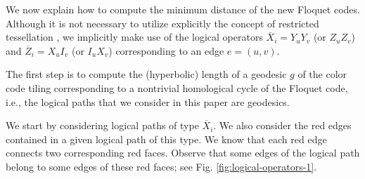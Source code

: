 \documentclass[%
reprint,
amsmath,amssymb,
aps,
]{revtex4-2}
\begin{document}
We now explain how to compute the minimum distance of the new Floquet codes. 
Although it is not necessary to utilize explicitly the concept of 
restricted tessellation \cite{Breuckmann2024}, we implicitly make use of the logical operators 
${\overline{X}}_{i}=Y_{u}Y_{v}$ (or $Z_{u}Z_{v}$) and ${\overline{Z}}_{i}=X_{u}I_{v}$ 
(or $I_{u}X_{v}$) corresponding to an edge $e=(u, v)$.

The first step is to compute the (hyperbolic) length of a geodesic $g$ of the color code 
tiling corresponding to a nontrivial homological cycle of the  Floquet code, i.e., 
the logical paths that we consider in this paper are geodesics.

We start by considering logical paths of type ${\overline{X}}_{i}$. We also consider 
the red edges contained in a given logical path of this type. We know that each 
red edge connects two corresponding red faces. Observe that some edges of the logical path belong to some edges of these red faces; see Fig. \ref{fig:logical-operators-1}.
\end{document}
